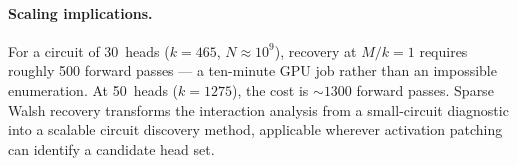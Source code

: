 \paragraph{Scaling implications.}

For a circuit of 30~heads ($k = 465$, $N \approx 10^9$), recovery at
$M/k = 1$ requires roughly 500 forward passes --- a ten-minute GPU job
rather than an impossible enumeration. At 50~heads ($k = 1275$), the
cost is ${\sim}1300$ forward passes. Sparse Walsh recovery transforms
the interaction analysis from a small-circuit diagnostic into a scalable
circuit discovery method, applicable wherever activation patching can
identify a candidate head set.
